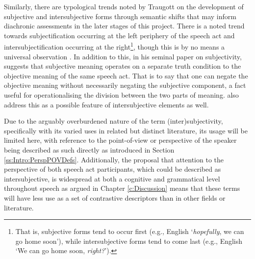 Similarly, there are typological trends noted by Traugott on the development of subjective and intersubjective forms through semantic shifts that may inform diachronic assessments in the later stages of this project. There is a noted trend towards subjectification occurring at the left periphery of the speech act and intersubjectification occurring at the right\footnote{That is, subjective forms tend to occur first (e.g., English `\textit{hopefully}, we can go home soon'), while intersubjective forms tend to come last (e.g., English `We can go home soon, \textit{right?}').}, though this is by no means a universal observation \cite{Traugott2014}. In addition to this, in his seminal paper on subjectivity,  suggests that subjective meaning operates on a separate truth condition to the objective meaning of the same speech act. That is to say that one can negate the objective meaning without necessarily negating the subjective component, a fact useful for operationalising the division between the two parts of meaning.  also address this as a possible feature of intersubjective elements as well.

Due to the arguably overburdened nature of the term (inter)subjectivity, specifically with its varied uses in related but distinct literature, its usage will be limited here, with reference to the point-of-view or perspective of the speaker being described as such directly as introduced in Section \ref{ss:Intro:PerspPOVDefs}. Additionally, the proposal that attention to the perspective of both speech act participants, which could be described as intersubjective, is widespread at both a cognitive and grammatical level throughout speech as argued in Chapter \ref{c:Discussion} means that these terms will have less use as a set of contrastive descriptors than in other fields or literature.
